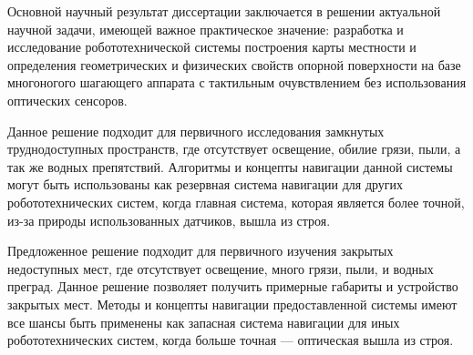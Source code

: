 
Основной  научный  результат  диссертации  заключается  в  решении  актуальной научной  задачи,  имеющей  важное  практическое  значение: разработка и исследование робототехнической системы построения карты местности и определения геометрических и физических свойств опорной поверхности на базе многоногого шагающего аппарата с тактильным очувствлением без использования оптических сенсоров.

Данное решение подходит для первичного исследования замкнутых труднодоступных пространств, где отсутствует освещение, обилие грязи, пыли, а так же водных препятствий. Алгоритмы и концепты навигации данной системы могут быть использованы как резервная система навигации для других робототехнических систем, когда главная система, которая является более точной, из-за природы использованных датчиков, вышла из строя.


Предложенное решение подходит для первичного изучения закрытых недоступных мест, где отсутствует освещение, много грязи, пыли, и водных преград. Данное решение позволяет получить примерные габариты и устройство закрытых мест. Методы и концепты навигации предоставленной системы имеют все шансы быть применены как запасная система навигации для иных робототехнических систем, когда больше точная --- оптическая вышла из строя.

